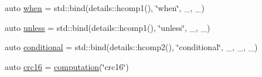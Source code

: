 \begin{DoxyCompactItemize}
\item 
auto \hyperlink{namespacepfq__lang_1_1anonymous__namespace_02default_8hpp_03_a10e1a2f363aa41a978622f322ac6241f}{when} = std\-::bind(details\-::hcomp1(), \char`\"{}when\char`\"{}, \-\_, \-\_)
\item 
auto \hyperlink{namespacepfq__lang_1_1anonymous__namespace_02default_8hpp_03_af01f3831a7b0294b6ffef87a09b481d7}{unless} = std\-::bind(details\-::hcomp1(), \char`\"{}unless\char`\"{}, \-\_, \-\_)
\item 
auto \hyperlink{namespacepfq__lang_1_1anonymous__namespace_02default_8hpp_03_a022d0075edf2fff575b93377aec0c228}{conditional} = std\-::bind(details\-::hcomp2(), \char`\"{}conditional\char`\"{}, \-\_, \-\_, \-\_)
\item 
auto \hyperlink{namespacepfq__lang_1_1anonymous__namespace_02default_8hpp_03_aaa12e1daf6bd2719a3b8592e673acf84}{crc16} = \hyperlink{namespacepfq__lang_ac0c16097c968653e72c609890dfb4c44}{computation}(\char`\"{}crc16\char`\"{})
\end{DoxyCompactItemize}


